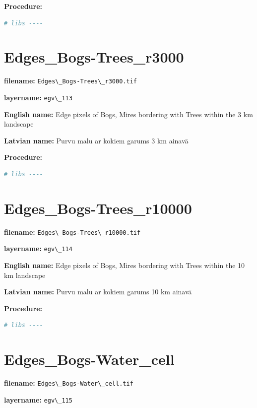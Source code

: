 \documentclass[
]{book}
\newcommand{\passthrough}[1]{#1}
\begin{document}
\textbf{Procedure:}

\begin{lstlisting}[language=R]
# libs ----
\end{lstlisting}

\section{Edges\_Bogs-Trees\_r3000}\label{ch06.113}

\textbf{filename:} \passthrough{\lstinline!Edges\_Bogs-Trees\_r3000.tif!}

\textbf{layername:} \passthrough{\lstinline!egv\_113!}

\textbf{English name:} Edge pixels of Bogs, Mires bordering with Trees within the 3 km landscape

\textbf{Latvian name:} Purvu malu ar kokiem garums 3 km ainavā

\textbf{Procedure:}

\begin{lstlisting}[language=R]
# libs ----
\end{lstlisting}

\section{Edges\_Bogs-Trees\_r10000}\label{ch06.114}

\textbf{filename:} \passthrough{\lstinline!Edges\_Bogs-Trees\_r10000.tif!}

\textbf{layername:} \passthrough{\lstinline!egv\_114!}

\textbf{English name:} Edge pixels of Bogs, Mires bordering with Trees within the 10 km landscape

\textbf{Latvian name:} Purvu malu ar kokiem garums 10 km ainavā

\textbf{Procedure:}

\begin{lstlisting}[language=R]
# libs ----
\end{lstlisting}

\section{Edges\_Bogs-Water\_cell}\label{ch06.115}

\textbf{filename:} \passthrough{\lstinline!Edges\_Bogs-Water\_cell.tif!}

\textbf{layername:} \passthrough{\lstinline!egv\_115!}
\end{document}
